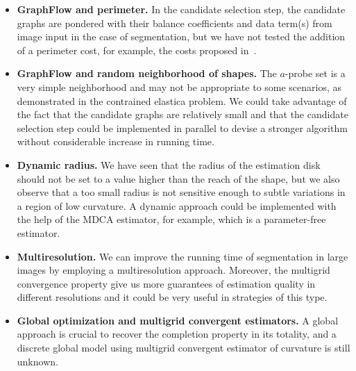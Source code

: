 \begin{itemize}
	\item[]{\textbf{GraphFlow and perimeter.} In the candidate selection step, the candidate graphs are pondered with their balance coefficients and data term(s) from image input in the case of segmentation, but we have not tested the addition of a perimeter cost, for example, the costs proposed in~\cite{boykov03geodesics}}. 
	\item[]{\textbf{GraphFlow and random neighborhood of shapes.} The $a$-probe set is a very simple neighborhood and may not be appropriate to some scenarios, as demonstrated in the contrained elastica problem. We could take advantage of the fact that the candidate graphs are relatively small and that the candidate selection step could be implemented in parallel to devise a stronger algorithm without considerable increase in running time.} 
	\item[]{\textbf{Dynamic radius.} We have seen that the radius of the estimation disk should not be set to a value higher than the reach of the shape, but we also observe that a too small radius is not sensitive enough to subtle variations in a region of low curvature. A dynamic approach could be implemented with the help of the MDCA estimator, for example, which is a parameter-free estimator. }
	\item[]{\textbf{Multiresolution.} We can improve the running time of segmentation in large images by employing a multiresolution approach. Moreover, the multigrid convergence property give us more guarantees of estimation quality in different resolutions and it could be very useful in strategies of this type.}
	\item[]{\textbf{Global optimization and multigrid convergent estimators.} A global approach is crucial to recover the completion property in its totality, and a discrete global model using multigrid convergent estimator of curvature is still unknown.}
\end{itemize}
 




